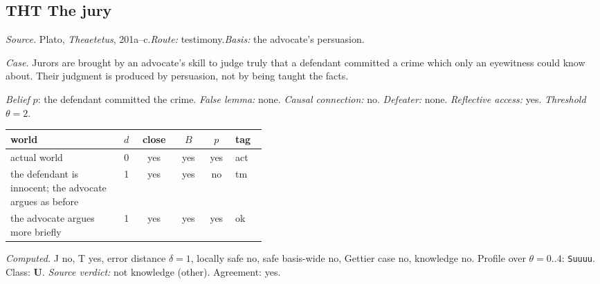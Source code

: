 \subsection*{THT \enspace The jury}
\noindent\textit{Source.} Plato, \emph{Theaetetus}, 201a--c.\quad \textit{Route:} testimony.\quad \textit{Basis:} the advocate's persuasion.\par
\noindent\textit{Case.} Jurors are brought by an advocate's skill to judge truly that a defendant committed a crime which only an eyewitness could know about. Their judgment is produced by persuasion, not by being taught the facts.\par
\noindent\textit{Belief} $p$: the defendant committed the crime.
 \textit{False lemma:} none. \textit{Causal connection:} no. \textit{Defeater:} none. \textit{Reflective access:} yes. \textit{Threshold} $\theta = 2$.\par
\begin{center}\begin{tabular}{@{}p{0.43\linewidth}rcccl@{}}
world & $d$ & close & $B$ & $p$ & tag \\ \midrule
actual world & 0 & yes & yes & yes & act \\
the defendant is innocent; the advocate argues as before & 1 & yes & yes & no & tm \\
the advocate argues more briefly & 1 & yes & yes & yes & ok \\
\end{tabular}\end{center}
\noindent\textit{Computed.} J no, T yes, error distance $\delta = 1$, locally safe no, safe basis-wide no, Gettier case no, knowledge no. Profile over $\theta = 0..4$: \texttt{Suuuu}. Class: \textbf{U}.
 \textit{Source verdict:} not knowledge (other). Agreement: yes.
\par\medskip
{}
